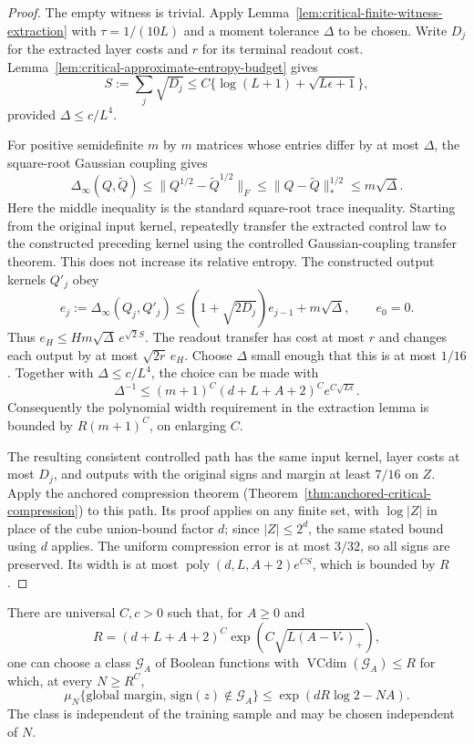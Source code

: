 \begin{proof}
The empty witness is trivial. Apply
Lemma~\ref{lem:critical-finite-witness-extraction} with
$\tau=1/(10L)$ and a moment tolerance $\Delta$ to be chosen.
Write $D_j$ for the extracted layer costs and $r$ for its terminal
readout cost. Lemma~\ref{lem:critical-approximate-entropy-budget}
gives
\[
 S:=\sum_j\sqrt{D_j}
 \le C\{\log(L+1)+\sqrt{L\epsilon+1}\},
\]
provided $\Delta\le c/L^4$.

For positive semidefinite $m$ by $m$ matrices whose entries differ by
at most $\Delta$, the square-root Gaussian coupling gives
\[
 \Delta_\infty(Q,\widetilde Q)
 \le\|Q^{1/2}-\widetilde Q^{1/2}\|_F
 \le\|Q-\widetilde Q\|_*^{1/2}
 \le m\sqrt\Delta.
\]
Here the middle inequality is the standard square-root trace inequality.
Starting from the original input kernel, repeatedly transfer the
extracted control law to the constructed preceding kernel using the
controlled Gaussian-coupling transfer theorem. This does not increase
its relative entropy. The constructed output kernels $Q'_j$ obey
\[
 e_j:=\Delta_\infty(Q_j,Q'_j)
 \le(1+\sqrt{2D_j})e_{j-1}+m\sqrt\Delta,\qquad e_0=0.
\]
Thus $e_H\le Hm\sqrt\Delta\,e^{\sqrt2 S}$.
The readout transfer has cost at most $r$ and changes each output by
at most $\sqrt{2r}\,e_H$. Choose $\Delta$ small enough that this is
at most $1/16$. Together with $\Delta\le c/L^4$, the choice can be
made with
\[
 \Delta^{-1}\le (m+1)^C(d+L+A+2)^C
                           e^{C\sqrt{L\epsilon}}.
\]
Consequently the polynomial width requirement in the extraction lemma
is bounded by $R(m+1)^C$, on enlarging $C$.

The resulting consistent controlled path has the same input kernel,
layer costs at most $D_j$, and outputs with the original signs and
margin at least $7/16$ on $Z$. Apply the anchored compression theorem
(Theorem~\ref{thm:anchored-critical-compression}) to this path. Its
proof applies on any finite set, with $\log|Z|$ in place of the cube
union-bound factor $d$; since $|Z|\le2^d$, the same stated bound using
$d$ applies. The uniform compression error is at most $3/32$, so all
signs are preserved. Its width is at most
$\operatorname{poly}(d,L,A+2)e^{CS}$, which is bounded by $R$.
\end{proof}

\begin{corollary}
\label{cor:critical-finite-width-exceptional-mass}
There are universal $C,c>0$ such that, for $A\ge0$ and
\[
 R=(d+L+A+2)^C\exp(C\sqrt{L(A-V_*)_+}),
\]
one can choose a class $\mathcal G_A$ of Boolean functions with
$\operatorname{VCdim}(\mathcal G_A)\le R$ for which, at every
$N\ge R^C$,
\[
 \mu_N\{\text{global margin, sign}(z)\notin\mathcal G_A\}
 \le \exp(dR\log2-NA).
\]
The class is independent of the training sample and may be chosen
independent of $N$.
\end{corollary}

